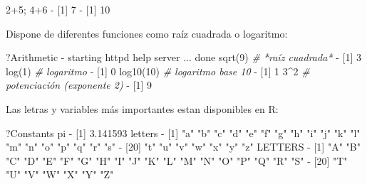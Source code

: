 \documentclass[
]{book}
\newenvironment{Shaded}{\begin{snugshade}}{\end{snugshade}}
\newcommand{\CommentTok}[1]{\textcolor[rgb]{0.56,0.35,0.01}{\textit{#1}}}
\newcommand{\DecValTok}[1]{\textcolor[rgb]{0.00,0.00,0.81}{#1}}
\newcommand{\FloatTok}[1]{\textcolor[rgb]{0.00,0.00,0.81}{#1}}
\newcommand{\FunctionTok}[1]{\textcolor[rgb]{0.00,0.00,0.00}{#1}}
\newcommand{\NormalTok}[1]{#1}
\newcommand{\SpecialCharTok}[1]{\textcolor[rgb]{0.00,0.00,0.00}{#1}}
\newcommand{\StringTok}[1]{\textcolor[rgb]{0.31,0.60,0.02}{#1}}
\begin{document}
\begin{Shaded}
\begin{Highlighting}[]
\DecValTok{2}\SpecialCharTok{+}\DecValTok{5}\NormalTok{; }\DecValTok{4}\SpecialCharTok{+}\DecValTok{6}
\SpecialCharTok{{-}}\NormalTok{ [}\DecValTok{1}\NormalTok{] }\DecValTok{7}
\SpecialCharTok{{-}}\NormalTok{ [}\DecValTok{1}\NormalTok{] }\DecValTok{10}
\end{Highlighting}
\end{Shaded}

Dispone de diferentes funciones como raíz cuadrada o logaritmo:

\begin{Shaded}
\begin{Highlighting}[]
\NormalTok{?Arithmetic}
\SpecialCharTok{{-}}\NormalTok{ starting httpd help server ... done}
\FunctionTok{sqrt}\NormalTok{(}\DecValTok{9}\NormalTok{) }\CommentTok{\# *raíz cuadrada*}
\SpecialCharTok{{-}}\NormalTok{ [}\DecValTok{1}\NormalTok{] }\DecValTok{3}
\FunctionTok{log}\NormalTok{(}\DecValTok{1}\NormalTok{)  }\CommentTok{\# logaritmo}
\SpecialCharTok{{-}}\NormalTok{ [}\DecValTok{1}\NormalTok{] }\DecValTok{0}
\FunctionTok{log10}\NormalTok{(}\DecValTok{10}\NormalTok{) }\CommentTok{\# logaritmo base 10}
\SpecialCharTok{{-}}\NormalTok{ [}\DecValTok{1}\NormalTok{] }\DecValTok{1}
\DecValTok{3}\SpecialCharTok{\^{}}\DecValTok{2} \CommentTok{\# potenciación (exponente 2)}
\SpecialCharTok{{-}}\NormalTok{ [}\DecValTok{1}\NormalTok{] }\DecValTok{9}
\end{Highlighting}
\end{Shaded}

Las letras y variables más importantes estan disponibles en R:

\begin{Shaded}
\begin{Highlighting}[]
\NormalTok{?Constants}
\NormalTok{pi}
\SpecialCharTok{{-}}\NormalTok{ [}\DecValTok{1}\NormalTok{] }\FloatTok{3.141593}
\NormalTok{letters}
\SpecialCharTok{{-}}\NormalTok{  [}\DecValTok{1}\NormalTok{] }\StringTok{"a"} \StringTok{"b"} \StringTok{"c"} \StringTok{"d"} \StringTok{"e"} \StringTok{"f"} \StringTok{"g"} \StringTok{"h"} \StringTok{"i"} \StringTok{"j"} \StringTok{"k"} \StringTok{"l"} \StringTok{"m"} \StringTok{"n"} \StringTok{"o"} \StringTok{"p"} \StringTok{"q"} \StringTok{"r"} \StringTok{"s"}
\SpecialCharTok{{-}}\NormalTok{ [}\DecValTok{20}\NormalTok{] }\StringTok{"t"} \StringTok{"u"} \StringTok{"v"} \StringTok{"w"} \StringTok{"x"} \StringTok{"y"} \StringTok{"z"}
\NormalTok{LETTERS}
\SpecialCharTok{{-}}\NormalTok{  [}\DecValTok{1}\NormalTok{] }\StringTok{"A"} \StringTok{"B"} \StringTok{"C"} \StringTok{"D"} \StringTok{"E"} \StringTok{"F"} \StringTok{"G"} \StringTok{"H"} \StringTok{"I"} \StringTok{"J"} \StringTok{"K"} \StringTok{"L"} \StringTok{"M"} \StringTok{"N"} \StringTok{"O"} \StringTok{"P"} \StringTok{"Q"} \StringTok{"R"} \StringTok{"S"}
\SpecialCharTok{{-}}\NormalTok{ [}\DecValTok{20}\NormalTok{] }\StringTok{"T"} \StringTok{"U"} \StringTok{"V"} \StringTok{"W"} \StringTok{"X"} \StringTok{"Y"} \StringTok{"Z"}
\end{Highlighting}
\end{Shaded}
\end{document}

